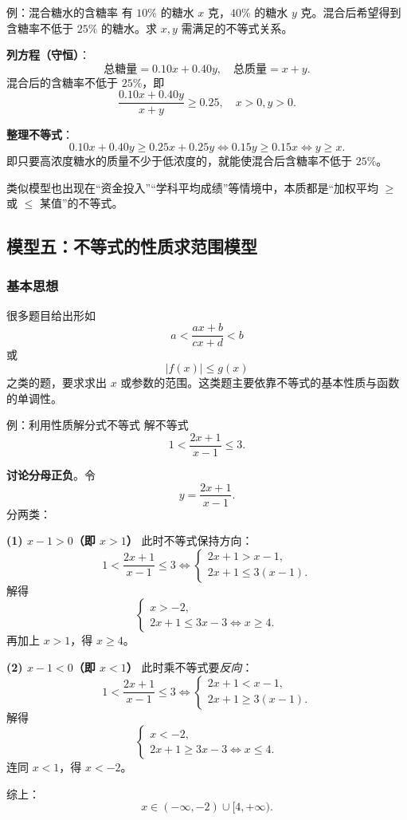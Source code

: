 \documentclass[a4paper,11pt]{ctexart}
\begin{document}
\begin{examplebox}[mathnote coverage=soft]{例：混合糖水的含糖率}
有 $10\%$ 的糖水 $x$ 克，$40\%$ 的糖水 $y$ 克。混合后希望得到含糖率不低于 $25\%$ 的糖水。求 $x,y$ 需满足的不等式关系。

\textbf{列方程（守恒）}：
\[
\text{总糖量}=0.10x+0.40y,
\quad
\text{总质量}=x+y.
\]
混合后的含糖率不低于 $25\%$，即
\[
\frac{0.10x+0.40y}{x+y}\ge 0.25,\quad x>0,y>0.
\]

\textbf{整理不等式}：
\[
0.10x+0.40y\ge 0.25x+0.25y
\iff
0.15y\ge 0.15x
\iff
y\ge x.
\]
即只要高浓度糖水的质量不少于低浓度的，就能使混合后含糖率不低于 $25\%$。
\end{examplebox}

类似模型也出现在“资金投入”“学科平均成绩”等情境中，本质都是“加权平均 $\ge$ 或 $\le$ 某值”的不等式。

\subsection{模型五：不等式的性质求范围模型}

\subsubsection*{基本思想}

很多题目给出形如
\[
a<\frac{ax+b}{cx+d}<b
\]
或
\[
|f(x)|\le g(x)
\]
之类的题，要求求出 $x$ 或参数的范围。这类题主要依靠不等式的基本性质与函数的单调性。

\begin{examplebox}[mathnote coverage=soft]{例：利用性质解分式不等式}
解不等式
\[
1<\frac{2x+1}{x-1}\le 3.
\]

\textbf{讨论分母正负}。令
\[
y=\frac{2x+1}{x-1}.
\]
分两类：

\textbf{(1) $x-1>0$（即 $x>1$）}  
此时不等式保持方向：
\[
1<\frac{2x+1}{x-1}\le 3
\iff
\begin{cases}
2x+1> x-1,\\[2pt]
2x+1\le 3(x-1).
\end{cases}
\]
解得
\[
\begin{cases}
x>-2,\\
2x+1\le 3x-3\iff x\ge 4.
\end{cases}
\]
再加上 $x>1$，得 $x\ge 4$。

\textbf{(2) $x-1<0$（即 $x<1$）}  
此时乘不等式要\emph{反向}：
\[
1<\frac{2x+1}{x-1}\le 3
\iff
\begin{cases}
2x+1<x-1,\\[2pt]
2x+1\ge 3(x-1).
\end{cases}
\]
解得
\[
\begin{cases}
x<-2,\\
2x+1\ge 3x-3\iff x\le 4.
\end{cases}
\]
连同 $x<1$，得 $x<-2$。

综上：
\[
x\in(-\infty,-2)\cup[4,+\infty).
\]
\end{examplebox}
\end{document}
